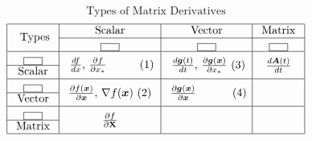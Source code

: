 \documentclass[12pt,thmsa]{article}
\newcommand{\emptybox}[2][0.6em]{%
	\fbox{\rule{0pt}{#1}\hspace{#2}}%
}
\begin{document}
\newpage
\[\text{Types of Matrix Derivatives}\]
\[
\begin{aligned}
	\begin{array}{|c|c|c|c|}
		\hline
		\multirow{2}{*}{ \text { Types }} & \text { Scalar } & \text { Vector } & \text { Matrix } \\
		\cline{2-4} & \fbox{\vspace{1em}\hspace{1em}} & \fbox{\vspace{1em}\hspace{1em}} & \fbox{\vspace{1em}\hspace{1em}} \\
		\hline
		\fbox{\vspace{1em}\hspace{1em}}
		 & \multirow{2}{*}{ \(\frac{d f}{d x}\), \(\frac{\partial f}{\partial x_{*}}\) \hspace{0.8cm} (1)} & \multirow{2}{*}{ \(\frac{d  \boldsymbol{g}(t)}{d t}\), \(\frac{\partial  \boldsymbol{g}(\boldsymbol{x})}{\partial x_{*}}\) (3)} & \multirow{2}{*}{ \(\frac{d  \boldsymbol{A}(t)}{d t}\) } \\
		\cline{1-1} \text{Scalar} &  &  &  \\
		\hline
		\fbox{\vspace{1em}\hspace{1em}}
		& \multirow{2}{*}{ \(\frac{\partial f(\boldsymbol{x}) }{\partial  \boldsymbol{x}}\), \(\nabla f(\boldsymbol{x})\) (2) } & \multirow{2}{*}{ \(\frac{\partial  \boldsymbol{g}(\boldsymbol{x}) }{\partial  \boldsymbol{x}}\) \hspace{0.9cm} (4)} & {} \\
		\cline{1-1} \text{Vector} &  &  &  \\
		\hline
		\fbox{\vspace{1em}\hspace{1em}}
		& \multirow{2}{*}{ \(\frac{\partial f}{\partial  \mathbf{X}}\) } & {} & {} \\
		\cline{1-1} \text{Matrix} &  &  &  \\
		\hline
	\end{array}
\end{aligned}
\]
\end{document}
